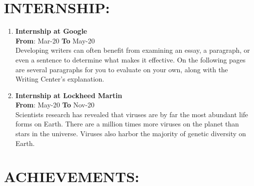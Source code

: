 \documentclass{article}
\begin{document}
\begin{multicols}{2}
\vspace{5pt}

\section*{\large{\uppercase{Internship:}}}


\begin{enumerate}
	\item {\textbf{Internship at Google}}\\
	\hfill {\textbf{From}}: Mar-20 {\textbf{To}} May-20\\
	Developing writers can often benefit from examining an essay, a paragraph, or even a sentence to determine what makes it effective. On the following pages are several paragraphs for you to evaluate on your own, along with the Writing Center's explanation.
	\item {\textbf{Internship at Lockheed Martin}}\\
	\hfill {\textbf{From}}: May-20 {\textbf{To}} Nov-20\\
	 Scientists research has revealed that viruses are by far the most abundant life forms on Earth. There are a million times more viruses on the planet than stars in the universe. Viruses also harbor the majority of genetic diversity on Earth. 
\end{enumerate}

\vspace{5pt}

\section*{\large{\uppercase{achievements:}}}

\vspace{0pt}
\vspace{5pt}

\end{multicols}
\end{document}
